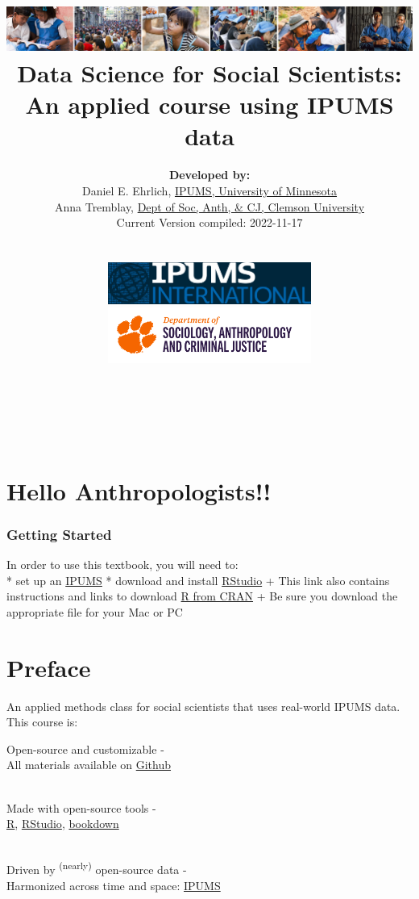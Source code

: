 \documentclass[
]{book}
\title{\includegraphics{ipums_banner.png}\\
Data Science for Social Scientists:\\
An applied course using IPUMS data }
\author{\textbf{Developed by:}\\
\hspace*{0.333em}\hspace*{0.333em}Daniel E. Ehrlich, \href{https://international.ipums.org/international/}{IPUMS, University of Minnesota}\\
\hspace*{0.333em}\hspace*{0.333em}Anna Tremblay, \href{https://www.clemson.edu/cbshs/departments/sacj/degrees/anthropology.html}{Dept of Soc, Anth, \& CJ, Clemson University}\\
\hspace*{0.333em}\hspace*{0.333em}Current Version compiled: 2022-11-17\\
\strut \\
\includegraphics[width=0.5\textwidth,height=\textheight]{ipums_i_logo.jpg}\\
\includegraphics[width=0.5\textwidth,height=\textheight]{clemson_logo.png}\\
\strut \\
\strut \\}
\date{}
\begin{document}
\maketitle

{
\setcounter{tocdepth}{1}
\tableofcontents
}
\hypertarget{hello-anthropologists}{%
\chapter*{Hello Anthropologists!!}\label{hello-anthropologists}}

\hypertarget{getting-started}{%
\subsection*{Getting Started}\label{getting-started}}

In order to use this textbook, you will need to:\\
* set up an \href{}{IPUMS}
* download and install \href{https://posit.co/download/rstudio-desktop/}{RStudio}
+ This link also contains instructions and links to download \href{https://cran.rstudio.com/}{R from CRAN}
+ Be sure you download the appropriate file for your Mac or PC

\hypertarget{preface}{%
\chapter*{Preface}\label{preface}}

An applied methods class for social scientists that uses real-world IPUMS data. This course is:

Open-source and customizable -\\
\hspace*{0.333em}\hspace*{0.333em}\hspace*{0.333em}All materials available on \href{https://github.com/ehrlichd/stats_book}{Github}\\
\strut \\
Made with open-source tools -\\
\hspace*{0.333em}\hspace*{0.333em}\href{https://cran.r-project.org/}{R}, \href{https://www.rstudio.com/products/rstudio/}{RStudio}, \href{https://bookdown.org/}{bookdown}\\
\strut \\
Driven by \textsuperscript{(nearly)} open-source data -\\
\hspace*{0.333em}\hspace*{0.333em}Harmonized across time and space: \href{https://ipums.org}{IPUMS}\\
\end{document}
